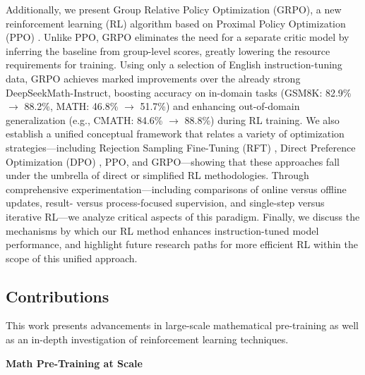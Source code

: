 Additionally, we present Group Relative Policy Optimization (GRPO), a new reinforcement learning (RL) algorithm based on Proximal Policy Optimization (PPO) \citep{schulman2017proximal}. Unlike PPO, GRPO eliminates the need for a separate critic model by inferring the baseline from group-level scores, greatly lowering the resource requirements for training. Using only a selection of English instruction-tuning data, GRPO achieves marked improvements over the already strong DeepSeekMath-Instruct, boosting accuracy on in-domain tasks (GSM8K: 82.9\% $\rightarrow$ 88.2\%, MATH: 46.8\% $\rightarrow$ 51.7\%) and enhancing out-of-domain generalization (e.g., CMATH: 84.6\% $\rightarrow$ 88.8\%) during RL training. We also establish a unified conceptual framework that relates a variety of optimization strategies—including Rejection Sampling Fine-Tuning (RFT) \citep{yuan2023scaling}, Direct Preference Optimization (DPO) \citep{dpo}, PPO, and GRPO—showing that these approaches fall under the umbrella of direct or simplified RL methodologies. Through comprehensive experimentation—including comparisons of online versus offline updates, result- versus process-focused supervision, and single-step versus iterative RL—we analyze critical aspects of this paradigm. Finally, we discuss the mechanisms by which our RL method enhances instruction-tuned model performance, and highlight future research paths for more efficient RL within the scope of this unified approach.

\subsection{Contributions}
This work presents advancements in large-scale mathematical pre-training as well as an in-depth investigation of reinforcement learning techniques.

\textbf{Math Pre-Training at Scale}

